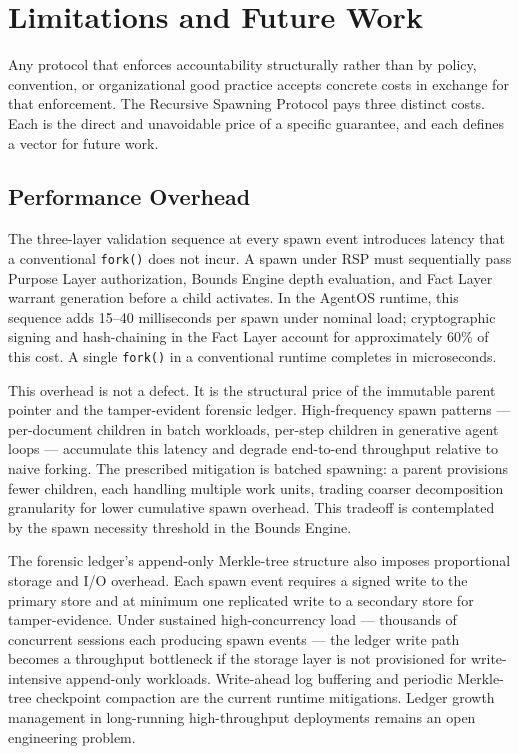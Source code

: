 \section{Limitations and Future Work}
\label{sec:rs-limitations}

Any protocol that enforces accountability structurally rather than by policy, convention, or organizational good practice accepts concrete costs in exchange for that enforcement. The Recursive Spawning Protocol pays three distinct costs. Each is the direct and unavoidable price of a specific guarantee, and each defines a vector for future work.

\subsection{Performance Overhead}
\label{sec:rs-perf-overhead}

The three-layer validation sequence at every spawn event introduces latency that a conventional \texttt{fork()} does not incur. A spawn under RSP must sequentially pass Purpose Layer authorization, Bounds Engine depth evaluation, and Fact Layer warrant generation before a child activates. In the AgentOS runtime, this sequence adds \numrange{15}{40} milliseconds per spawn under nominal load; cryptographic signing and hash-chaining in the Fact Layer account for approximately 60\% of this cost. A single \texttt{fork()} in a conventional runtime completes in microseconds.

This overhead is not a defect. It is the structural price of the immutable parent pointer and the tamper-evident forensic ledger. High-frequency spawn patterns --- per-document children in batch workloads, per-step children in generative agent loops --- accumulate this latency and degrade end-to-end throughput relative to naive forking. The prescribed mitigation is batched spawning: a parent provisions fewer children, each handling multiple work units, trading coarser decomposition granularity for lower cumulative spawn overhead. This tradeoff is contemplated by the spawn necessity threshold in the Bounds Engine.

The forensic ledger's append-only Merkle-tree structure also imposes proportional storage and I/O overhead. Each spawn event requires a signed write to the primary store and at minimum one replicated write to a secondary store for tamper-evidence. Under sustained high-concurrency load --- thousands of concurrent sessions each producing spawn events --- the ledger write path becomes a throughput bottleneck if the storage layer is not provisioned for write-intensive append-only workloads. Write-ahead log buffering and periodic Merkle-tree checkpoint compaction are the current runtime mitigations. Ledger growth management in long-running high-throughput deployments remains an open engineering problem.

